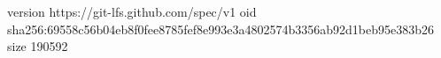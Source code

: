 version https://git-lfs.github.com/spec/v1
oid sha256:69558c56b04eb8f0fee8785fef8e993e3a4802574b3356ab92d1beb95e383b26
size 190592
